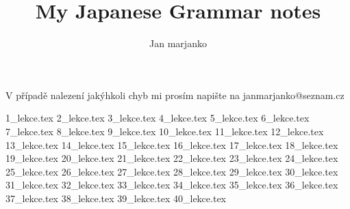\documentclass[article]{jlreq}
\title{My Japanese Grammar notes}
\author{Jan marjanko}
\begin{document}
\maketitle
\newpage
V případě nalezení jakýhkoli chyb mi prosím napište na janmarjanko@seznam.cz
\newpage
\tableofcontents
\newpage

{1_lekce.tex}%
{2_lekce.tex}%
{3_lekce.tex}%
{4_lekce.tex}%
{5_lekce.tex} %
{6_lekce.tex}%
{7_lekce.tex}%
{8_lekce.tex}%
{9_lekce.tex}%
{10_lekce.tex}%
{11_lekce.tex}%
{12_lekce.tex}%
{13_lekce.tex}%
{14_lekce.tex}%
{15_lekce.tex}%
{16_lekce.tex}%
{17_lekce.tex}%
{18_lekce.tex}%
{19_lekce.tex}
{20_lekce.tex}%
{21_lekce.tex}
{22_lekce.tex}
{23_lekce.tex}
{24_lekce.tex}
{25_lekce.tex}%
{26_lekce.tex}%
{27_lekce.tex}%
{28_lekce.tex}%
{29_lekce.tex}%
{30_lekce.tex}%
{31_lekce.tex}%
{32_lekce.tex}%
{33_lekce.tex}%
{34_lekce.tex}%
{35_lekce.tex}%
{36_lekce.tex}%
{37_lekce.tex}%
{38_lekce.tex}%
{39_lekce.tex}%
{40_lekce.tex}%
\end{document}
